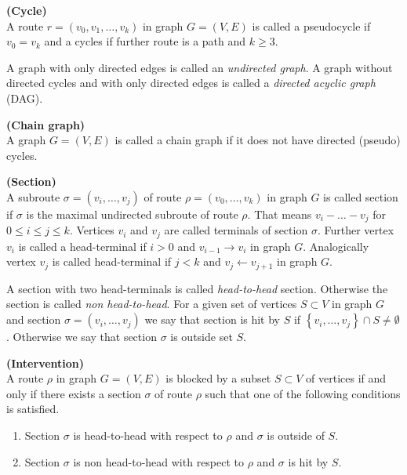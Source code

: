 \begin{defi} {\textbf{(Cycle)}} \\
	A route $r = (v_0, v_1, \dots, v_k)$ in graph $G = (V, E)$ is called a pseudocycle if $v_0 = v_k$ and 
	a cycles if further route is a path and $k \ge 3$.
\end{defi}

A graph with only directed edges is called an \textit{undirected graph}. A graph without directed cycles 
and with only directed edges is called a \textit{directed acyclic graph} (DAG).


\begin{defi} {\textbf{(Chain graph)}} \\
	A graph $G = (V, E)$ is called a chain graph if it does not have directed (pseudo) cycles.
\end{defi}



\begin{defi} {\textbf{(Section)}} \\
	A subroute $\sigma = (v_i, \dots, v_j)$ of route $\rho = (v_0, \dots, v_k)$ in graph $G$ is called section if $			\sigma$ is the maximal undirected subroute of route $\rho$. That means $v_i - \dots - v_j$ for $0 \le i \le j 			\le k$. Vertices $v_i$ and $v_j$ are called terminals of section $\sigma$. Further vertex $v_i$ is called a 			head-terminal if $i>0$ and $v_{i-1} \rightarrow v_i$ in graph $G$. Analogically vertex $v_j$ is called 
	head-terminal if $j<k$ and $v_j \leftarrow v_{j+1}$ in graph $G$.
\end{defi}


A section with two head-terminals is called \textit{head-to-head} section. Otherwise the section is called 
\textit{non head-to-head}. For a given set of vertices $S \subset V$ in graph $G$ and section $\sigma = (v_i, \dots, v_j)$ we say that section is hit by $S$ if $\left\lbrace v_i , \dots, v_j \right\rbrace \cap S \neq \emptyset$. Otherwise we say that section $\sigma$ is outside set $S$.



\begin{defi} {\textbf{(Intervention)}} \\
	A route $\rho$ in graph $G = (V, E)$ is blocked by a subset $S \subset V$ of vertices if and only if there 				exists a section $\sigma$ of route $\rho$ such that one of the following conditions is satisfied.
	
	\begin{enumerate}
		\item Section $\sigma$ is head-to-head with respect to $\rho$ and $\sigma$ is outside of $S$.
		\item Section $\sigma$ is non head-to-head with respect to $\rho$ and $\sigma$ is hit by $S$.
	\end{enumerate}
	
\end{defi}




